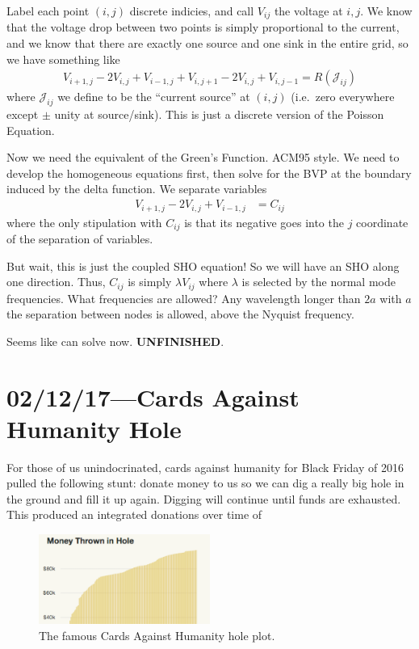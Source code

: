 \documentclass[12pt]{report}
\begin{document}
Label each point $(i,j)$ discrete indicies, and call $V_{ij}$ the voltage at
$i,j$. We know that the voltage drop between two points is simply proportional
to the current, and we know that there are exactly one source and one sink in
the entire grid, so we have something like
\begin{align}
    V_{i+1,j} - 2V_{i,j} + V_{i-1,j} + V_{i,j+1} - 2V_{i,j} + V_{i,j-1} =
        R\left( \mathcal{J}_{ij} \right)
\end{align}
where $\mathcal{J}_{ij}$ we define to be the ``current source'' at $(i,j)$
(i.e.\ zero everywhere except $\pm$ unity at source/sink). This is just a
discrete version of the Poisson Equation.

Now we need the equivalent of the Green's Function. ACM95 style. We need to
develop the homogeneous equations first, then solve for the BVP at the boundary
induced by the delta function. We separate variables
\begin{align}
    V_{i+1,j} - 2V_{i,j} + V_{i-1,j} &= C_{ij}
\end{align}
where the only stipulation with $C_{ij}$ is that its negative goes into the $j$
coordinate of the separation of variables.

But wait, this is just the coupled SHO equation! So we will have an SHO along
one direction. Thus, $C_{ij}$ is simply $\lambda V_{ij}$ where $\lambda$ is
selected by the normal mode frequencies. What frequencies are allowed? Any
wavelength longer than $2a$ with $a$ the separation between nodes is allowed,
above the Nyquist frequency.

Seems like can solve now. \textbf{UNFINISHED}.

\chapter{02/12/17---Cards Against Humanity Hole}

For those of us unindocrinated, cards against humanity for Black Friday of 2016
pulled the following stunt: donate money to us so we can dig a really big hole
in the ground and fill it up again. Digging will continue until funds are
exhausted. This produced an integrated donations over time of
\begin{figure}[!h]
    \centering
    \includegraphics[width=0.5\textwidth]{hole.png}
    \caption{The famous Cards Against Humanity hole plot.\label{fig:hole}}
\end{figure}
\end{document}
